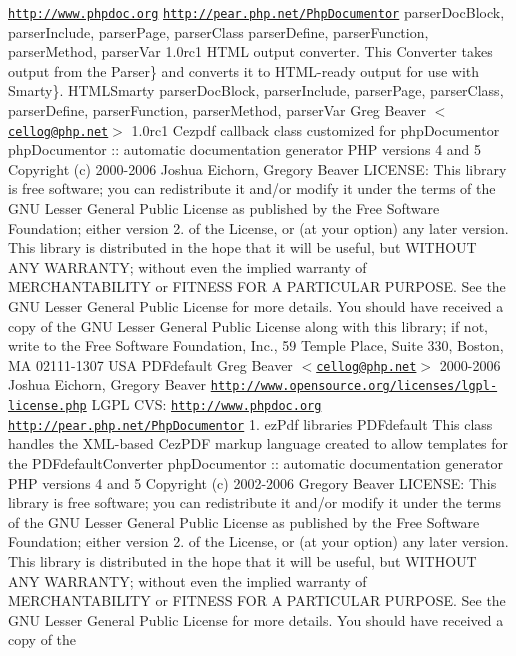 \href{http://www.phpdoc.org}{\tt http\-://www.\-phpdoc.\-org}  \href{http://pear.php.net/PhpDocumentor}{\tt http\-://pear.\-php.\-net/\-Php\-Documentor}  parser\-Doc\-Block, parser\-Include, parser\-Page, parser\-Class  parser\-Define, parser\-Function, parser\-Method, parser\-Var  1.\-0rc1  \-H\-T\-M\-L output converter. \-This \-Converter takes output from the  \-Parser\} and converts it to \-H\-T\-M\-L-\/ready output for use with  \-Smarty\}.   \-H\-T\-M\-L\-Smarty  parser\-Doc\-Block, parser\-Include, parser\-Page, parser\-Class, parser\-Define, parser\-Function, parser\-Method, parser\-Var  \-Greg \-Beaver $<$\href{mailto:cellog@php.net}{\tt cellog@php.\-net}$>$  1.\-0rc1    \-Cezpdf callback class customized for php\-Documentor  php\-Documentor \-:\-: automatic documentation generator  \-P\-H\-P versions 4 and 5  \-Copyright (c) 2000-\/2006 \-Joshua \-Eichorn, \-Gregory \-Beaver  \-L\-I\-C\-E\-N\-S\-E\-:  \-This library is free software; you can redistribute it and/or modify it under the terms of the \-G\-N\-U \-Lesser \-General \-Public \-License as published by the \-Free \-Software \-Foundation; either version 2. of the \-License, or (at your option) any later version.  \-This library is distributed in the hope that it will be useful, but \-W\-I\-T\-H\-O\-U\-T \-A\-N\-Y \-W\-A\-R\-R\-A\-N\-T\-Y; without even the implied warranty of \-M\-E\-R\-C\-H\-A\-N\-T\-A\-B\-I\-L\-I\-T\-Y or \-F\-I\-T\-N\-E\-S\-S \-F\-O\-R \-A \-P\-A\-R\-T\-I\-C\-U\-L\-A\-R \-P\-U\-R\-P\-O\-S\-E. \-See the \-G\-N\-U \-Lesser \-General \-Public \-License for more details.  \-You should have received a copy of the \-G\-N\-U \-Lesser \-General \-Public \-License along with this library; if not, write to the \-Free \-Software \-Foundation, \-Inc., 59 \-Temple \-Place, \-Suite 330, \-Boston, \-M\-A 02111-\/1307 \-U\-S\-A   \-P\-D\-Fdefault  \-Greg \-Beaver $<$\href{mailto:cellog@php.net}{\tt cellog@php.\-net}$>$  2000-\/2006 \-Joshua \-Eichorn, \-Gregory \-Beaver  \href{http://www.opensource.org/licenses/lgpl-license.php}{\tt http\-://www.\-opensource.\-org/licenses/lgpl-\/license.\-php} \-L\-G\-P\-L  \-C\-V\-S\-:    \href{http://www.phpdoc.org}{\tt http\-://www.\-phpdoc.\-org}  \href{http://pear.php.net/PhpDocumentor}{\tt http\-://pear.\-php.\-net/\-Php\-Documentor}  1.  ez\-Pdf libraries   \-P\-D\-Fdefault  \-This class handles the \-X\-M\-L-\/based \-Cez\-P\-D\-F markup language created to allow templates for the \-P\-D\-Fdefault\-Converter  php\-Documentor \-:\-: automatic documentation generator  \-P\-H\-P versions 4 and 5  \-Copyright (c) 2002-\/2006 \-Gregory \-Beaver  \-L\-I\-C\-E\-N\-S\-E\-:  \-This library is free software; you can redistribute it and/or modify it under the terms of the \-G\-N\-U \-Lesser \-General \-Public \-License as published by the \-Free \-Software \-Foundation; either version 2. of the \-License, or (at your option) any later version.  \-This library is distributed in the hope that it will be useful, but \-W\-I\-T\-H\-O\-U\-T \-A\-N\-Y \-W\-A\-R\-R\-A\-N\-T\-Y; without even the implied warranty of \-M\-E\-R\-C\-H\-A\-N\-T\-A\-B\-I\-L\-I\-T\-Y or \-F\-I\-T\-N\-E\-S\-S \-F\-O\-R \-A \-P\-A\-R\-T\-I\-C\-U\-L\-A\-R \-P\-U\-R\-P\-O\-S\-E. \-See the \-G\-N\-U \-Lesser \-General \-Public \-License for more details.  \-You should have received a copy of the 